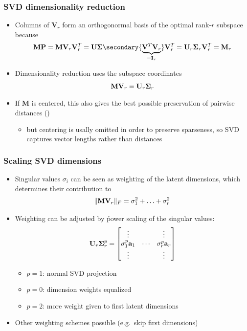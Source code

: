\documentclass[t]{beamer} %
\begin{document}
\begin{frame}
  \frametitle{SVD dimensionality reduction}

  \begin{itemize}
  \item Columns of $\mathbf{V}_r$ form an orthogonormal basis of the optimal rank-$r$ subspace because
    \[
      \mathbf{M} \mathbf{P} = \mathbf{M} \mathbf{V}_r \mathbf{V}_r^T
      = \mathbf{U} \Msigma \secondary{\underbrace{\mathbf{V}^T \mathbf{V}_r}_{= \mathbf{I}_r}} \mathbf{V}_r^T
      = \mathbf{U}_r \Msigma_r \mathbf{V}_r^T = \mathbf{M}_r
    \]
  \item<2-> \h{Dimensionality reduction} uses the subspace coordinates
    \[
      \mathbf{M} \mathbf{V}_r = \mathbf{U}_r \Msigma_r
    \]
  \item<3-> If $\mathbf{M}$ is centered, this also gives the best possible
    preservation of pairwise distances \so {}
    ()
    \begin{itemize}
    \item[\hand] but centering is usally omitted in order to preserve sparseness,
      so SVD captures vector lengths rather than distances
    \end{itemize}
  \end{itemize}
\end{frame}

\begin{frame}
  \frametitle{Scaling SVD dimensions}

  \begin{itemize}
  \item Singular values $\sigma_i$ can be seen as weighting of the latent
    dimensions, which determines their contribution to
    \[
      \norm[F]{\mathbf{M} \mathbf{V}_r} = \sigma_1^2 + \ldots + \sigma_r^2
    \]
  \item Weighting can be adjusted by \h{power scaling} of the singular values:
    \[
      \mathbf{U}_r \Msigma_r^p
      = \begin{bmatrix}
        \vdots &  & \vdots \\
        \sigma_1^p \va_1 & \cdots & \sigma_r^p \va_r \\
        \vdots &  & \vdots 
      \end{bmatrix}
    \]
    \ungap[1]
    \begin{itemize}
    \item $p = 1$: normal SVD projection
    \item $p = 0$: dimension weights equalized
    \item $p = 2$: more weight given to first latent dimensions
    \end{itemize}
  \item Other weighting schemes possible (e.g.\ skip first dimensions)
  \end{itemize}
\end{frame}
\end{document}
